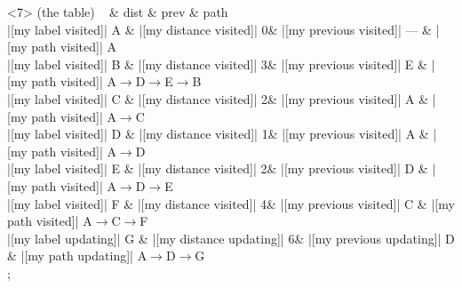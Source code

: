 \begin{visibleenv}<7>
 (the table) {
~ \& dist \& prev \& path \\
|[my label visited]| A \& |[my distance visited]| 0\& |[my previous visited]| --- \& |[my path visited]| A\\
|[my label visited]| B \& |[my distance visited]| 3\& |[my previous visited]| E \& |[my path visited]| A$\rightarrow$D$\rightarrow$E$\rightarrow$B\\
|[my label visited]| C \& |[my distance visited]| 2\& |[my previous visited]| A \& |[my path visited]| A$\rightarrow$C\\
|[my label visited]| D \& |[my distance visited]| 1\& |[my previous visited]| A \& |[my path visited]| A$\rightarrow$D\\
|[my label visited]| E \& |[my distance visited]| 2\& |[my previous visited]| D \& |[my path visited]| A$\rightarrow$D$\rightarrow$E\\
|[my label visited]| F \& |[my distance visited]| 4\& |[my previous visited]| C \& |[my path visited]| A$\rightarrow$C$\rightarrow$F\\
|[my label updating]| G \& |[my distance updating]| 6\& |[my previous updating]| D \& |[my path updating]| A$\rightarrow$D$\rightarrow$G\\
};
\end{visibleenv}
            

